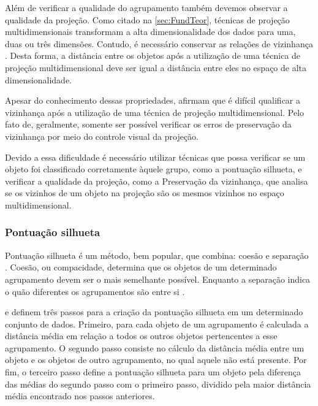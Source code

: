 			Além de verificar a qualidade do agrupamento também devemos observar a
			qualidade da projeção. Como citado na \cref{sec:FundTeor}, técnicas de projeção
			multidimensionais transformam a alta dimensionalidade dos dados para uma, duas
			ou três dimensões. Contudo, é necessário conservar as relações de vizinhança
			\cite{bauer1992quantifying}. Desta forma, a distância entre os objetos após a
			utilização de uma técnica de projeção multidimensional deve ser igual a distância
			entre eles no espaço de alta dimensionalidade.
			
			Apesar do conhecimento dessas propriedades, 
			afirmam que é difícil qualificar a vizinhança após a utilização de uma técnica
			de projeção multidimensional. Pelo fato de, geralmente, somente ser possível
			verificar os erros de preservação da vizinhança por meio do controle visual
			da projeção.
			
			Devido a essa dificuldade é necessário utilizar técnicas que possa verificar
			se um objeto foi classificado corretamente àquele grupo, como a pontuação
			silhueta, e verificar a qualidade da projeção, como a Preservação da vizinhança,
			que analisa se os vizinhos de um objeto na projeção são os mesmos vizinhos
			no espaço multidimensional.
			
			\subsubsection{Pontuação silhueta}

				Pontuação silhueta é um método, bem popular, que combina: coesão e separação
				\cite{Tan:2005:ch8}. Coesão, ou compacidade, determina que os objetos
				de um determinado agrupamento devem ser o mais semelhante possível. Enquanto
				a separação indica o quão diferentes os agrupamentos são entre si
				\cite{Tan:2005:ch8, Berry:1997:DMT:560675}.
				
				 e  definem
				três passos para a criação da pontuação silhueta em um determinado conjunto
				de dados. Primeiro, para cada objeto de um agrupamento é calculada a distância
				média em relação a todos os outros objetos pertencentes a esse agrupamento.
				O segundo passo consiste no cálculo da distância média entre um objeto e 
				os objetos de outro agrupamento, no qual aquele não está presente. Por fim, o
				terceiro passo define a pontuação silhueta para um objeto pela diferença das
				médias do segundo passo com o primeiro passo, dividido pela maior distância média
				encontrado nos passos anteriores.
				
